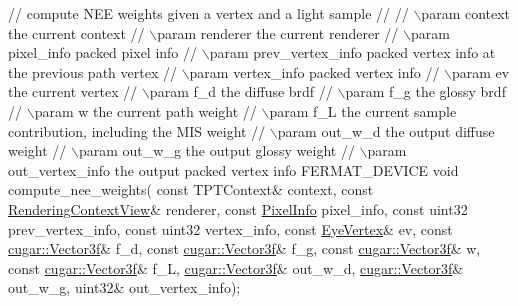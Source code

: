 \begin{DoxyParagraph}{}
\begin{DoxyEnumerate}
\begin{DoxyCode}
  \textcolor{comment}{// compute NEE weights given a vertex and a light sample}
  \textcolor{comment}{//}
  \textcolor{comment}{// \(\backslash\)param context               the current context}
  \textcolor{comment}{// \(\backslash\)param renderer              the current renderer}
  \textcolor{comment}{// \(\backslash\)param pixel\_info            packed pixel info}
  \textcolor{comment}{// \(\backslash\)param prev\_vertex\_info      packed vertex info at the previous path vertex}
  \textcolor{comment}{// \(\backslash\)param vertex\_info           packed vertex info}
  \textcolor{comment}{// \(\backslash\)param ev                    the current vertex}
  \textcolor{comment}{// \(\backslash\)param f\_d                   the diffuse brdf}
  \textcolor{comment}{// \(\backslash\)param f\_g                   the glossy brdf}
  \textcolor{comment}{// \(\backslash\)param w                     the current path weight}
  \textcolor{comment}{// \(\backslash\)param f\_L                   the current sample contribution, including the MIS weight}
  \textcolor{comment}{// \(\backslash\)param out\_w\_d               the output diffuse weight}
  \textcolor{comment}{// \(\backslash\)param out\_w\_g               the output glossy weight}
  \textcolor{comment}{// \(\backslash\)param out\_vertex\_info       the output packed vertex info}
  FERMAT\_DEVICE
  \textcolor{keywordtype}{void} compute\_nee\_weights(
      \textcolor{keyword}{const} TPTContext&           context,
      \textcolor{keyword}{const} \hyperlink{struct_rendering_context_view}{RenderingContextView}& renderer,
      \textcolor{keyword}{const} \hyperlink{union_pixel_info}{PixelInfo}             pixel\_info,
      \textcolor{keyword}{const} uint32                prev\_vertex\_info,
      \textcolor{keyword}{const} uint32                vertex\_info,
      \textcolor{keyword}{const} \hyperlink{struct_eye_vertex}{EyeVertex}&            ev,
      \textcolor{keyword}{const} \hyperlink{structcugar_1_1_vector}{cugar::Vector3f}&      f\_d,
      \textcolor{keyword}{const} \hyperlink{structcugar_1_1_vector}{cugar::Vector3f}&      f\_g,
      \textcolor{keyword}{const} \hyperlink{structcugar_1_1_vector}{cugar::Vector3f}&      w,
      \textcolor{keyword}{const} \hyperlink{structcugar_1_1_vector}{cugar::Vector3f}&      f\_L,
            \hyperlink{structcugar_1_1_vector}{cugar::Vector3f}&      out\_w\_d,
            \hyperlink{structcugar_1_1_vector}{cugar::Vector3f}&      out\_w\_g,
            uint32&               out\_vertex\_info);


\end{DoxyCode}
\end{DoxyEnumerate}
\end{DoxyParagraph}
